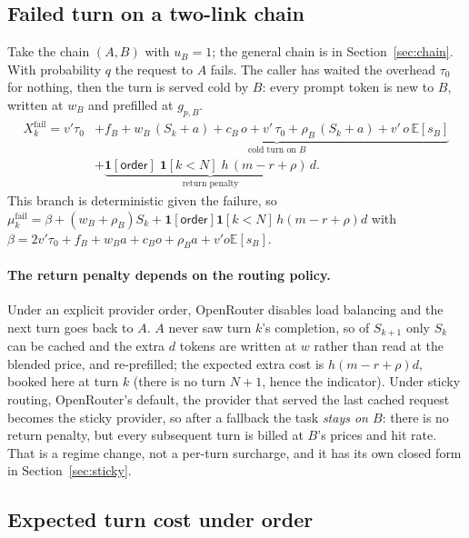 \documentclass[11pt]{article}
\newcommand{\E}{\mathbb{E}}
\newcommand{\ind}{\mathbf{1}}
\begin{document}
\subsection{Failed turn on a two-link chain}

Take the chain $(A, B)$ with $u_B = 1$; the general chain is in
Section~\ref{sec:chain}. With probability $q$ the request to $A$ fails. The
caller has waited the overhead $\tau_0$ for nothing, then the turn is served
cold by $B$: every prompt token is new to $B$, written at $w_B$ and prefilled
at $g_{p,B}$.
\begin{equation}\label{eq:turn-fail}
\begin{split}
  X_k^{\text{fail}}
  = v' \tau_0
  &+ \underbrace{f_B + w_B\,(S_k + a) + c_B\, o + v'\,\tau_0 + \rho_B\,(S_k + a) + v'\, o\,\E[s_B]}_{\text{cold turn on } B} \\
  &+ \underbrace{\ind[\textsf{order}]\;\ind[k < N]\;h\,(m - r + \rho)\, d}_{\text{return penalty}} .
\end{split}
\end{equation}
This branch is deterministic given the failure, so
$\mu_k^{\text{fail}} = \beta + (w_B + \rho_B) S_k + \ind[\textsf{order}]\ind[k<N]\,h(m-r+\rho)d$
with $\beta = 2 v'\tau_0 + f_B + w_B a + c_B o + \rho_B a + v' o \E[s_B]$.

\paragraph{The return penalty depends on the routing policy.}
Under an explicit provider \textsf{order}, OpenRouter disables load balancing
and the next turn goes back to $A$. $A$ never saw turn $k$'s completion, so of
$S_{k+1}$ only $S_k$ can be cached and the extra $d$ tokens are written at $w$
rather than read at the blended price, and re-prefilled; the expected extra cost is $h(m-r+\rho)d$,
booked here at turn $k$ (there is no turn $N+1$, hence the indicator). Under
\textsf{sticky} routing, OpenRouter's default, the provider that served the last
cached request becomes the sticky provider, so after a fallback the task
\emph{stays on $B$}: there is no return penalty, but every subsequent turn is
billed at $B$'s prices and hit rate. That is a regime change, not a per-turn
surcharge, and it has its own closed form in Section~\ref{sec:sticky}.

\subsection{Expected turn cost under \textsf{order}}
\end{document}
